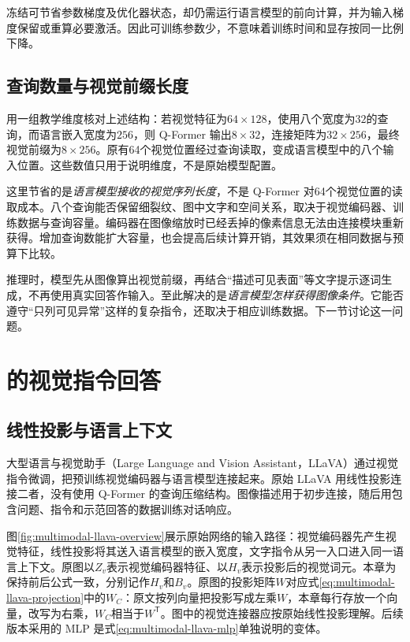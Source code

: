 冻结可节省参数梯度及优化器状态，却仍需运行语言模型的前向计算，并为输入梯度保留或重算必要激活。因此可训练参数少，不意味着训练时间和显存按同一比例下降。

\subsection{查询数量与视觉前缀长度}
用一组教学维度核对上述结构：若视觉特征为$64\times128$，使用八个宽度为$32$的查询，而语言嵌入宽度为$256$，则 Q-Former 输出$8\times32$，连接矩阵为$32\times256$，最终视觉前缀为$8\times256$。原有64个视觉位置经过查询读取，变成语言模型中的八个输入位置。这些数值只用于说明维度，不是原始模型配置。

这里节省的是\emph{语言模型接收的视觉序列长度}，不是 Q-Former 对64个视觉位置的读取成本。八个查询能否保留细裂纹、图中文字和空间关系，取决于视觉编码器、训练数据与查询容量。编码器在图像缩放时已经丢掉的像素信息无法由连接模块重新获得。增加查询数能扩大容量，也会提高后续计算开销，其效果须在相同数据与预算下比较。

推理时，模型先从图像算出视觉前缀，再结合“描述可见表面”等文字提示逐词生成，不再使用真实回答作输入。至此解决的是\emph{语言模型怎样获得图像条件}。它能否遵守“只列可见异常”这样的复杂指令，还取决于相应训练数据。下一节讨论这一问题。

\section{\texorpdfstring{}{LLaVA} 的视觉指令回答}
\subsection{线性投影与语言上下文}
大型语言与视觉助手（Large Language and Vision Assistant，LLaVA）通过视觉指令微调，把预训练视觉编码器与语言模型连接起来。原始 LLaVA 用线性投影连接二者，没有使用 Q-Former 的查询压缩结构。图像描述用于初步连接，随后用包含问题、指令和示范回答的数据训练对话响应。

图\ref{fig:multimodal-llava-overview}展示原始网络的输入路径：视觉编码器先产生视觉特征，线性投影将其送入语言模型的嵌入宽度，文字指令从另一入口进入同一语言上下文。原图以$Z_v$表示视觉编码器特征、以$H_v$表示投影后的视觉词元。本章为保持前后公式一致，分别记作$H_v$和$B_v$。原图的投影矩阵$W$对应式\eqref{eq:multimodal-llava-projection}中的$W_C$：原文按列向量把投影写成左乘$W$，本章每行存放一个向量，改写为右乘，$W_C$相当于$W^{\mathsf T}$。图中的视觉连接器应按原始线性投影理解。后续版本采用的 MLP 是式\eqref{eq:multimodal-llava-mlp}单独说明的变体。

